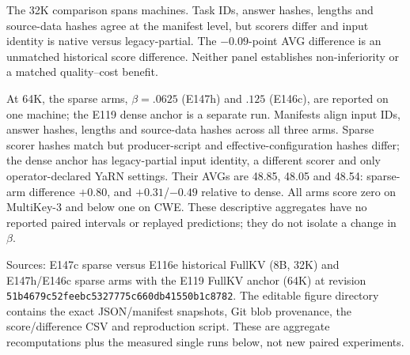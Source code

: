 \documentclass[10pt,letterpaper]{article}
\begin{document}
\par\medskip\noindent The 32K comparison spans machines. Task IDs, answer hashes, lengths and source-data hashes agree at the manifest level, but scorers differ and input identity is native versus legacy-partial. The $-0.09$-point AVG difference is an unmatched historical score difference. Neither panel establishes non-inferiority or a matched quality--cost benefit.

\par\medskip\noindent At 64K, the sparse arms, $\beta=.0625$ (E147h) and $.125$ (E146c), are reported on one machine; the E119 dense anchor is a separate run. Manifests align input IDs, answer hashes, lengths and source-data hashes across all three arms. Sparse scorer hashes match but producer-script and effective-configuration hashes differ; the dense anchor has legacy-partial input identity, a different scorer and only operator-declared YaRN settings. Their AVGs are 48.85, 48.05 and 48.54: sparse-arm difference $+0.80$, and $+0.31$/$-0.49$ relative to dense. All arms score zero on MultiKey-3 and below one on CWE. These descriptive aggregates have no reported paired intervals or replayed predictions; they do not isolate a change in $\beta$.

\par\medskip\noindent Sources: E147c sparse versus E116e historical FullKV (8B, 32K) and E147h/E146c sparse arms with the E119 FullKV anchor (64K) at revision \texttt{51b4679c52feebc5327775c660db41550b1c8782}. The editable figure directory contains the exact JSON/manifest snapshots, Git blob provenance, the score/difference CSV and reproduction script. These are aggregate recomputations plus the measured single runs below, not new paired experiments.
\end{document}

